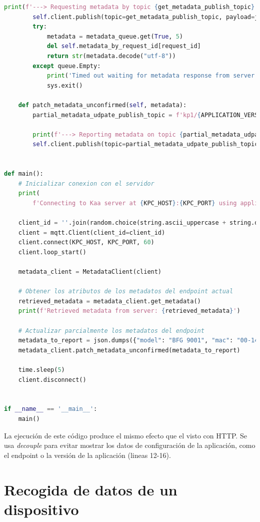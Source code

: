 {\begin{lstlisting}[language=Python]
        print(f'---> Requesting metadata by topic {get_metadata_publish_topic}')
        self.client.publish(topic=get_metadata_publish_topic, payload=json.dumps({}))
        try:
            metadata = metadata_queue.get(True, 5)
            del self.metadata_by_request_id[request_id]
            return str(metadata.decode("utf-8"))
        except queue.Empty:
            print('Timed out waiting for metadata response from server')
            sys.exit()

    def patch_metadata_unconfirmed(self, metadata):
        partial_metadata_udpate_publish_topic = f'kp1/{APPLICATION_VERSION}/epmx/{ENDPOINT_TOKEN}/update/keys'

        print(f'---> Reporting metadata on topic {partial_metadata_udpate_publish_topic}\nwith payload {metadata}')
        self.client.publish(topic=partial_metadata_udpate_publish_topic, payload=metadata)


def main():
    # Inicializar conexion con el servidor
    print(
        f'Connecting to Kaa server at {KPC_HOST}:{KPC_PORT} using application version {APPLICATION_VERSION} and endpoint token {ENDPOINT_TOKEN}')

    client_id = ''.join(random.choice(string.ascii_uppercase + string.digits) for _ in range(6))
    client = mqtt.Client(client_id=client_id)
    client.connect(KPC_HOST, KPC_PORT, 60)
    client.loop_start()

    metadata_client = MetadataClient(client)

    # Obtener los atributos de los metadatos del endpoint actual
    retrieved_metadata = metadata_client.get_metadata()
    print(f'Retrieved metadata from server: {retrieved_metadata}')

    # Actualizar parcialmente los metadatos del endpoint
    metadata_to_report = json.dumps({"model": "BFG 9001", "mac": "00-14-22-02-23-45"})
    metadata_client.patch_metadata_unconfirmed(metadata_to_report)

    time.sleep(5)
    client.disconnect()


if __name__ == '__main__':
    main()

\end{lstlisting}

La ejecución de este código produce el mismo efecto que el visto con HTTP. Se usa \textit{decouple} para evitar mostrar los datos de configuración de la aplicación, como el endpoint o la versión de la aplicación (lineas 12-16).

\section{Recogida de datos de un dispositivo}

}
